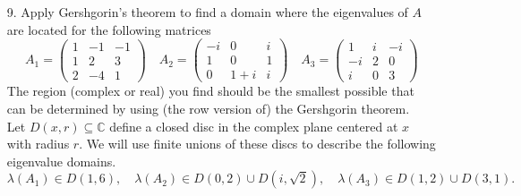 \documentclass[11pt]{article}
\newcommand{\n}{\vspace{0.3cm}}
\newcommand{\C}{\mathbb{C}}
\begin{document}
\begin{enumerate}
	\item[9.] Apply Gershgorin’s theorem to find a domain where the eigenvalues of \(A\) are located for the following matrices
		\[
			A_1 = \left(\begin{array}{rrr} 1 & -1 & -1 \\ 1 & 2 & 3 \\ 2 & -4 & 1 \end{array}\right) \quad
			A_2 = \left(\begin{array}{rrr} -i & 0 & i \\ 1 & 0 & 1 \\ 0 & 1+i & i \end{array}\right) \quad
			A_3 = \left(\begin{array}{rrr} 1 & i & -i \\ -i & 2 & 0 \\ i & 0 & 3 \end{array}\right)
		\]
		The region (complex or real) you find should be the smallest possible that can be determined by using (the row version of) the Gershgorin theorem. \n\\
    Let \(D(x,r) \subseteq \C\) define a closed disc in the complex plane centered at \(x\) with radius \(r\).  We will use finite unions of these discs to describe the following eigenvalue domains.
    \[\lambda(A_1) \in D(1,6), \quad \lambda(A_2) \in D(0,2) \cup D(i,\sqrt2), \quad \lambda(A_3) \in D(1,2) \cup D(3,1).\]


\end{enumerate}
\end{document}
